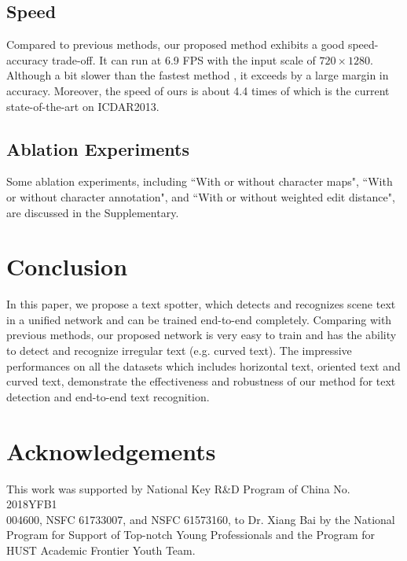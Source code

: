 \documentclass[runningheads]{llncs}
\begin{document}
\subsection{Speed}

Compared to previous methods,  our proposed method exhibits a good speed-accuracy trade-off. It can run at 6.9 FPS with the input scale of $720 \times 1280$. Although a bit slower than the fastest method \cite{Busta_2017_ICCV},  it exceeds \cite{Busta_2017_ICCV} by a large margin in accuracy. Moreover, the speed of ours is about 4.4 times of \cite{Li_2017_ICCV} which is the current state-of-the-art on ICDAR2013.

\subsection{Ablation Experiments}
Some ablation experiments, including ``With or without character maps", ``With or without character annotation", and ``With or without weighted edit distance", are discussed in the Supplementary.

\section{Conclusion}
In this paper, we propose a text spotter, which detects and recognizes scene text in a unified network and can be trained end-to-end completely. Comparing with previous methods, our proposed network is very easy to train and has the ability to detect and recognize irregular text (e.g. curved text). The impressive  performances on all the datasets which  includes  horizontal text,  oriented text and curved text,  demonstrate the effectiveness and robustness of our method for text detection and end-to-end text recognition.

\section*{Acknowledgements}
This work was supported by National Key R\&D Program of China No. 2018YFB1\\004600, NSFC 61733007, and NSFC 61573160, to Dr. Xiang Bai by the National Program for Support of Top-notch Young Professionals and the Program for HUST Academic Frontier Youth Team.


\end{document}
